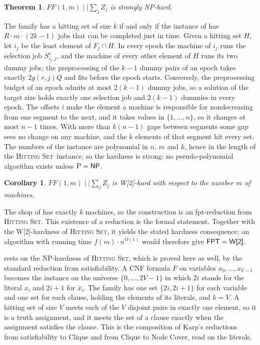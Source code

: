 \documentclass[11pt,a4paper]{article}
\newtheorem{theorem}{Theorem}
\newtheorem{corollary}{Corollary}
\theoremstyle{definition}
\theoremstyle{plain}
\newcommand{\FFu}{FF(1,m)\mid\mid\textstyle\sum_j Z_j}
\newcommand{\HS}{\textsc{Hitting Set}}
\newcommand{\NP}{\textnormal{\textsf{NP}}}
\newcommand{\Wtwo}{\textnormal{\textsf{W[2]}}}
\newcommand{\FPT}{\textnormal{\textsf{FPT}}}
\begin{document}
\setcounter{theorem}{0}
\begin{theorem}\label{thm:NP-hard}
$\FFu$ is strongly \NP-hard.
\end{theorem}
The family has a hitting set of size $k$ if and only if the instance of 
has $R\cdot m\cdot(2k-1)$ jobs that can be completed just in time. Given a hitting set $H$, let
$i_j$ be the least element of $F_j\cap H$. In every epoch the machine of $i_j$ runs the
selection job $S^r_{i_j,j}$, and the machine of every other element of $H$ runs its two dummy
jobs; the preprocessing of the $k-1$ dummy pairs of an epoch takes exactly $2g(r,j)Q$ and fits
before the epoch starts. Conversely, the preprocessing budget of an epoch admits at most
$2(k-1)$ dummy jobs, so a solution of the target size holds exactly one selection job and
$2(k-1)$ dummies in every epoch. The offsets $i$ make the element a machine is responsible for
nondecreasing from one segment to the next, and it takes values in $\{1,\ldots,n\}$, so it
changes at most $n-1$ times. With more than $k(n-1)$ gaps between segments some gap sees no
change on any machine, and the $k$ elements of that segment hit every set.
The numbers of the instance are polynomial in $n$, $m$ and $k$, hence in the length of the
\HS\ instance, so the hardness is strong: no pseudo-polynomial algorithm exists unless
$\mathrm P=\NP$.

\begin{corollary}\label{cor:W2}
$\FFu$ is \Wtwo-hard with respect to the number $m$ of machines.
\end{corollary}
The shop of  has exactly $k$ machines, so the construction is an
fpt-reduction from \HS. This existence of a reduction is the formal statement.
Together with the W[2]-hardness of \HS, it yields the stated hardness consequence;
an algorithm with running time $f(m)\cdot n^{O(1)}$ would therefore give $\FPT=\Wtwo$.

 rests on the \NP-hardness of \HS, which is proved here as well, by the
standard reduction from satisfiability. A CNF formula $F$ on variables $x_0,\ldots,x_{V-1}$
becomes the instance on the universe $\{0,\ldots,2V-1\}$ in which $2i$ stands for the literal
$x_i$ and $2i+1$ for $\bar x_i$. The family has one set $\{2i,2i+1\}$ for each variable and one
set for each clause, holding the elements of its literals, and $k=V$. A hitting set of size $V$
meets each of the $V$ disjoint pairs in exactly one element, so it is a truth assignment, and
it meets the set of a clause exactly when the assignment satisfies the clause. This is the
composition of Karp's reductions~\cite{Karp72} from satisfiability to Clique and from Clique to
Node Cover, read on the literals.
\end{document}
